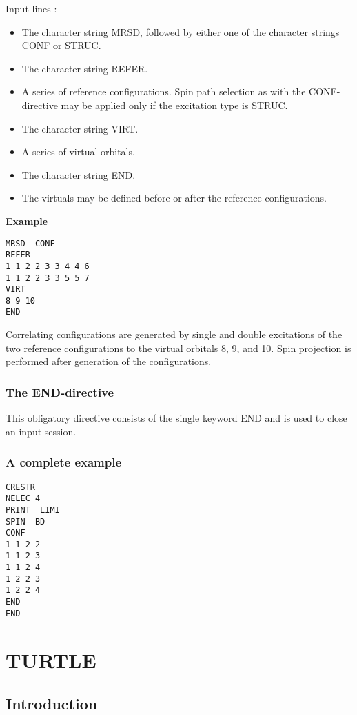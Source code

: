 \documentclass[11pt,fleqn]{article}
\begin{document}
Input-lines :
\begin{itemize}
\item The character string MRSD, followed by either one of the character strings
CONF or STRUC.
\item The character string REFER.
\item A series of reference configurations. Spin path selection as with the 
CONF-directive may be applied only if the excitation type is STRUC.
\item The character string VIRT.
\item A series of virtual orbitals.
\item The character string END.
\item The virtuals may be defined before or after the reference configurations.
\end{itemize}

{\bf Example }
\begin{verbatim}
MRSD  CONF
REFER
1 1 2 2 3 3 4 4 6
1 1 2 2 3 3 5 5 7
VIRT
8 9 10
END
\end{verbatim}

Correlating configurations are generated by single and double excitations 
of the two reference configurations to the virtual orbitals 8, 9, and 10. 
Spin projection is performed after generation of the configurations.

\subsubsection{The END-directive}

This obligatory directive consists of the single keyword END and is used 
to close an input-session.

\subsubsection{A complete example}

\begin{verbatim}
CRESTR
NELEC 4
PRINT  LIMI
SPIN  BD
CONF
1 1 2 2
1 1 2 3
1 1 2 4
1 2 2 3
1 2 2 4
END
END
\end{verbatim}


\section{TURTLE}

\subsection{Introduction}
\end{document}
